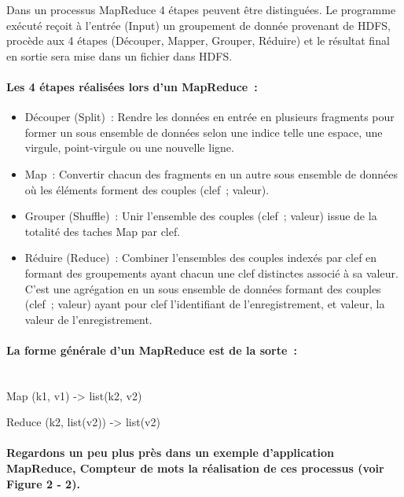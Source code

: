 \documentclass[12pt,french]{book}
\begin{document}
Dans un processus MapReduce 4 étapes peuvent être distinguées.
Le programme exécuté reçoit à l’entrée (Input) un groupement de donnée provenant de HDFS, procède aux 4 étapes (Découper, Mapper, Grouper, Réduire) et le résultat final en sortie sera mise dans un fichier dans HDFS.

\paragraph{Les 4 étapes réalisées lors d’un MapReduce :}

\begin{itemize}  
\item 
Découper (Split) : Rendre les données en entrée en plusieurs fragments pour former un sous ensemble de données selon une indice telle une espace, une virgule, point-virgule ou une nouvelle ligne.
\item
Map :  Convertir chacun des fragments en un autre sous ensemble de données où les éléments forment des couples (clef ; valeur).   
\item
Grouper (Shuffle) : Unir l’ensemble des couples (clef ; valeur) issue de la totalité des taches Map par clef.  
\item
Réduire (Reduce) : Combiner l’ensembles des couples indexés par clef en formant des groupements ayant chacun une clef distinctes associé à sa valeur.  C’est une agrégation en un sous ensemble de données formant des couples (clef ; valeur) ayant pour clef l’identifiant de l’enregistrement, et valeur, la valeur de l’enregistrement.
\end{itemize}


\paragraph{La forme générale d’un MapReduce est de la sorte :}\mbox{}\\

Map		(k1, v1)		->		list(k2, v2)

Reduce	(k2, list(v2))	->		list(v2)

\paragraph{Regardons un peu plus près dans un exemple d’application MapReduce, Compteur de mots la réalisation de ces processus (voir Figure 2 - 2).}

\newpage
\end{document}
